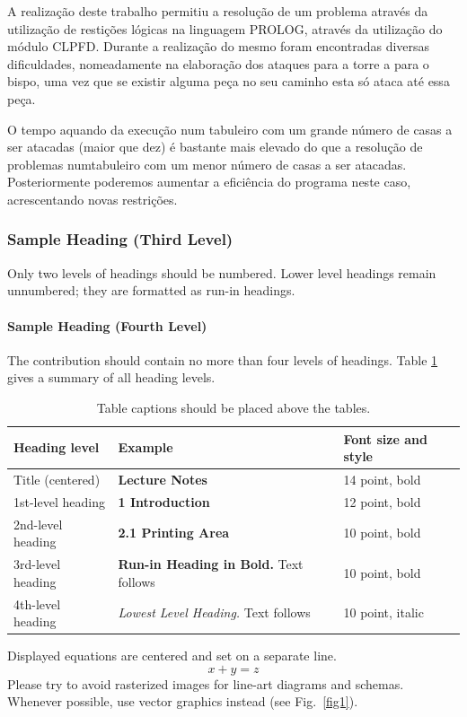 \documentclass[runningheads]{llncs}
\begin{document}
A realização deste trabalho permitiu a resolução de um problema através da utilização de restições lógicas na linguagem PROLOG, através da utilização do módulo CLPFD.
Durante a realização do mesmo foram encontradas diversas dificuldades, nomeadamente na elaboração dos ataques para a torre a para o bispo, uma vez que se existir alguma peça no seu caminho esta só ataca até essa peça.

O tempo aquando da execução num tabuleiro com um grande número de casas a ser atacadas (maior que dez) é bastante mais elevado do que a resolução de problemas numtabuleiro com 
um menor número de casas a ser atacadas. Posteriormente poderemos aumentar a eficiência do programa neste caso, acrescentando novas restrições.

\subsubsection{Sample Heading (Third Level)} Only two levels of
headings should be numbered. Lower level headings remain unnumbered;
they are formatted as run-in headings.
\paragraph{Sample Heading (Fourth Level)}
The contribution should contain no more than four levels of
headings. Table \ref{tab1} gives a summary of all heading levels.

\begin{table}
\caption{Table captions should be placed above the
tables.}\label{tab1}
\begin{tabular}{|l|l|l|}
\hline
Heading level &  Example & Font size and style\\
\hline
Title (centered) &  {\Large\bfseries Lecture Notes} & 14 point, bold\\
1st-level heading &  {\large\bfseries 1 Introduction} & 12 point, bold\\
2nd-level heading & {\bfseries 2.1 Printing Area} & 10 point, bold\\
3rd-level heading & {\bfseries Run-in Heading in Bold.} Text follows & 10 point, bold\\
4th-level heading & {\itshape Lowest Level Heading.} Text follows & 10 point, italic\\
\hline
\end{tabular}
\end{table}


\noindent Displayed equations are centered and set on a separate
line.
\begin{equation}
x + y = z
\end{equation}
Please try to avoid rasterized images for line-art diagrams and
schemas. Whenever possible, use vector graphics instead (see
Fig.~\ref{fig1}).
\end{document}
